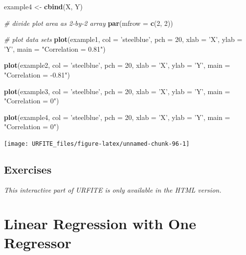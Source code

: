 \documentclass[]{book}
\newenvironment{Shaded}{\begin{snugshade}}{\end{snugshade}}
\newcommand{\KeywordTok}[1]{\textcolor[rgb]{0.13,0.29,0.53}{\textbf{#1}}}
\newcommand{\DataTypeTok}[1]{\textcolor[rgb]{0.13,0.29,0.53}{#1}}
\newcommand{\DecValTok}[1]{\textcolor[rgb]{0.00,0.00,0.81}{#1}}
\newcommand{\StringTok}[1]{\textcolor[rgb]{0.31,0.60,0.02}{#1}}
\newcommand{\CommentTok}[1]{\textcolor[rgb]{0.56,0.35,0.01}{\textit{#1}}}
\newcommand{\NormalTok}[1]{#1}
\theoremstyle{definition}
\theoremstyle{definition}
\theoremstyle{definition}
\theoremstyle{remark}
\begin{document}
\begin{Shaded}
\begin{Highlighting}[]
\NormalTok{example4 <-}\StringTok{ }\KeywordTok{cbind}\NormalTok{(X, Y)}

\CommentTok{# divide plot area as 2-by-2 array}
\KeywordTok{par}\NormalTok{(}\DataTypeTok{mfrow =} \KeywordTok{c}\NormalTok{(}\DecValTok{2}\NormalTok{, }\DecValTok{2}\NormalTok{))}

\CommentTok{# plot data sets}
\KeywordTok{plot}\NormalTok{(example1, }\DataTypeTok{col =} \StringTok{'steelblue'}\NormalTok{, }\DataTypeTok{pch =} \DecValTok{20}\NormalTok{, }\DataTypeTok{xlab =} \StringTok{'X'}\NormalTok{, }\DataTypeTok{ylab =} \StringTok{'Y'}\NormalTok{, }
     \DataTypeTok{main =} \StringTok{"Correlation = 0.81"}\NormalTok{)}

\KeywordTok{plot}\NormalTok{(example2, }\DataTypeTok{col =} \StringTok{'steelblue'}\NormalTok{, }\DataTypeTok{pch =} \DecValTok{20}\NormalTok{, }\DataTypeTok{xlab =} \StringTok{'X'}\NormalTok{, }\DataTypeTok{ylab =} \StringTok{'Y'}\NormalTok{, }
     \DataTypeTok{main =} \StringTok{"Correlation = -0.81"}\NormalTok{)}

\KeywordTok{plot}\NormalTok{(example3, }\DataTypeTok{col =} \StringTok{'steelblue'}\NormalTok{, }\DataTypeTok{pch =} \DecValTok{20}\NormalTok{, }\DataTypeTok{xlab =} \StringTok{'X'}\NormalTok{, }\DataTypeTok{ylab =} \StringTok{'Y'}\NormalTok{, }
     \DataTypeTok{main =} \StringTok{"Correlation = 0"}\NormalTok{)}

\KeywordTok{plot}\NormalTok{(example4, }\DataTypeTok{col =} \StringTok{'steelblue'}\NormalTok{, }\DataTypeTok{pch =} \DecValTok{20}\NormalTok{, }\DataTypeTok{xlab =} \StringTok{'X'}\NormalTok{, }\DataTypeTok{ylab =} \StringTok{'Y'}\NormalTok{, }
     \DataTypeTok{main =} \StringTok{"Correlation = 0"}\NormalTok{)}
\end{Highlighting}
\end{Shaded}

\begin{center}\texttt{[image: URFITE\_files/figure-latex/unnamed-chunk-96-1]} \end{center}

\section{Exercises}\label{exercises-1}

\begin{center}\textit{This interactive part of URFITE is only available in the HTML version.}\end{center}

\hypertarget{lrwor}{\chapter{Linear Regression with One
Regressor}\label{lrwor}}
\end{document}
